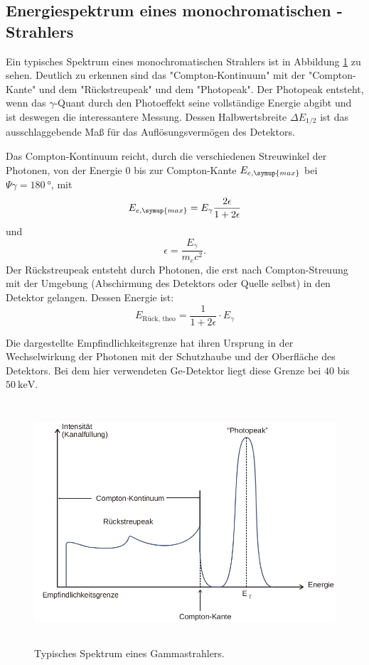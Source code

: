 \subsection{Energiespektrum eines monochromatischen \texorpdfstring{\gamma-}{gamma}Strahlers}
Ein typisches Spektrum eines monochromatischen Strahlers ist in Abbildung \ref{fig:Spektrum} zu sehen.
Deutlich zu erkennen sind das "Compton-Kontinuum" mit der "Compton-Kante" und dem "Rückstreupeak" und dem "Photopeak".
Der Photopeak entsteht, wenn das $\gamma$-Quant durch den Photoeffekt seine vollständige Energie abgibt und ist deswegen die interessantere Messung.
Dessen Halbwertsbreite $\Delta E_{1/2}$ ist das ausschlaggebende Maß für das Auflösungsvermögen des Detektors.

Das Compton-Kontinuum reicht, durch die verschiedenen Streuwinkel der Photonen, von der Energie 0 bis zur Compton-Kante $E_{e,\symup{max}}$ bei $\Psi{\gamma}=\SI{180}{\degree}$, mit
\begin{equation}
\label{eqn:Com_Kante}
E_{e,\symup{max}}=E_{\gamma}\frac{2\epsilon}{1+2\epsilon}
\end{equation}
und
\begin{equation*}
\epsilon = \frac{E_{\gamma}}{m_e c^2}.
\end{equation*}
Der Rückstreupeak entsteht durch Photonen, die erst nach Compton-Streuung mit der Umgebung (Abschirmung des Detektors oder Quelle selbst) in den Detektor gelangen.
Dessen Energie ist:
\begin{equation}
  \label{eqn:rueck}
  E_\text{Rück, theo} = \frac{1}{1+2\epsilon} \cdot E_{\gamma}
\end{equation}

Die dargestellte Empfindlichkeitsgrenze hat ihren Ursprung in der Wechselwirkung der Photonen mit der Schutzhaube und der Oberfläche des Detektors.
Bei dem hier verwendeten Ge-Detektor liegt diese Grenze bei $40$ bis $\SI{50}{\kilo\electronvolt}$.
 \begin{figure}
   \centering
   \includegraphics[height=9cm]{content/Spektrum.png}
   \caption{Typisches Spektrum eines Gammastrahlers.\cite{V18}}
   \label{fig:Spektrum}
 \end{figure}